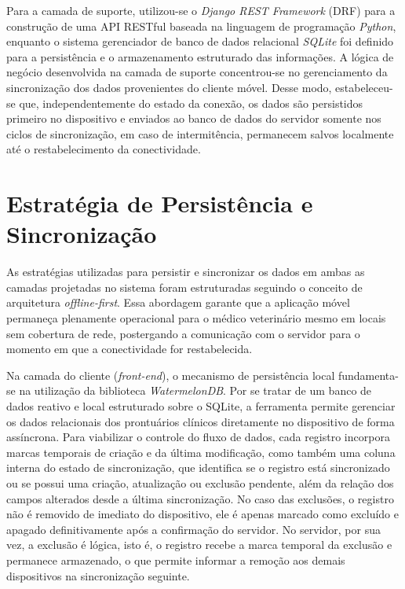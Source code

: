 Para a camada de suporte, utilizou-se o \textit{Django REST Framework} (DRF) \cite{drf} para a construção de uma API RESTful baseada na linguagem de programação \textit{Python}, enquanto o sistema gerenciador de banco de dados relacional \textit{SQLite} foi definido para a persistência e o armazenamento estruturado das informações. A lógica de negócio desenvolvida na camada de suporte concentrou-se no gerenciamento da sincronização dos dados provenientes do cliente móvel. Desse modo, estabeleceu-se que, independentemente do estado da conexão, os dados são persistidos primeiro no dispositivo e enviados ao banco de dados do servidor somente nos ciclos de sincronização, em caso de intermitência, permanecem salvos localmente até o restabelecimento da conectividade.

\section{Estratégia de Persistência e Sincronização}
As estratégias utilizadas para persistir e sincronizar os dados em ambas as camadas projetadas no sistema foram estruturadas seguindo o conceito de arquitetura \textit{offline-first}. Essa abordagem garante que a aplicação móvel permaneça plenamente operacional para o médico veterinário mesmo em locais sem cobertura de rede, postergando a comunicação com o servidor para o momento em que a conectividade for restabelecida.

Na camada do cliente (\textit{front-end}), o mecanismo de persistência local fundamenta-se na utilização da biblioteca \textit{WatermelonDB}. Por se tratar de um banco de dados reativo e local estruturado sobre o SQLite, a ferramenta permite gerenciar os dados relacionais dos prontuários clínicos diretamente no dispositivo de forma assíncrona. Para viabilizar o controle do fluxo de dados, cada registro incorpora marcas temporais de criação e da última modificação, como também uma coluna interna do estado de sincronização, que identifica se o registro está sincronizado ou se possui uma criação, atualização ou exclusão pendente, além da relação dos campos alterados desde a última sincronização. No caso das exclusões, o registro não é removido de imediato do dispositivo, ele é apenas marcado como excluído e apagado definitivamente após a confirmação do servidor. No servidor, por sua vez, a exclusão é lógica, isto é, o registro recebe a marca temporal da exclusão e permanece armazenado, o que permite informar a remoção aos demais dispositivos na sincronização seguinte.

